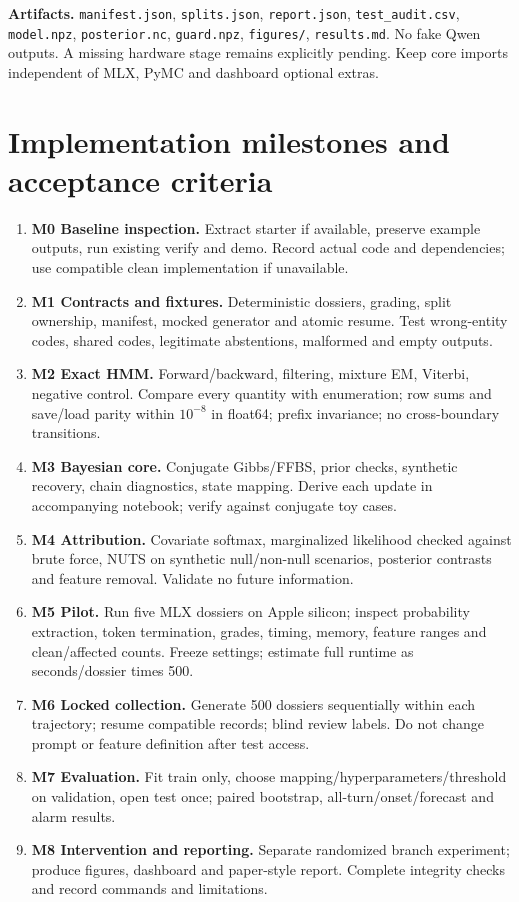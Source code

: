\documentclass[11pt,letterpaper]{article}
\newcommand{\sectionpage}[1]{\clearpage\section{#1}}
\begin{document}
\textbf{Artifacts.} \texttt{manifest.json}, \texttt{splits.json}, \texttt{report.json}, \texttt{test\_audit.csv}, \texttt{model.npz}, \texttt{posterior.nc}, \texttt{guard.npz}, \texttt{figures/}, \texttt{results.md}. No fake Qwen outputs. A missing hardware stage remains explicitly pending. Keep core imports independent of MLX, PyMC and dashboard optional extras.

\sectionpage{Implementation milestones and acceptance criteria}
\begin{enumerate}
\item \textbf{M0 Baseline inspection.} Extract starter if available, preserve example outputs, run existing verify and demo. Record actual code and dependencies; use compatible clean implementation if unavailable.
\item \textbf{M1 Contracts and fixtures.} Deterministic dossiers, grading, split ownership, manifest, mocked generator and atomic resume. Test wrong-entity codes, shared codes, legitimate abstentions, malformed and empty outputs.
\item \textbf{M2 Exact HMM.} Forward/backward, filtering, mixture EM, Viterbi, negative control. Compare every quantity with enumeration; row sums and save/load parity within $10^{-8}$ in float64; prefix invariance; no cross-boundary transitions.
\item \textbf{M3 Bayesian core.} Conjugate Gibbs/FFBS, prior checks, synthetic recovery, chain diagnostics, state mapping. Derive each update in accompanying notebook; verify against conjugate toy cases.
\item \textbf{M4 Attribution.} Covariate softmax, marginalized likelihood checked against brute force, NUTS on synthetic null/non-null scenarios, posterior contrasts and feature removal. Validate no future information.
\item \textbf{M5 Pilot.} Run five MLX dossiers on Apple silicon; inspect probability extraction, token termination, grades, timing, memory, feature ranges and clean/affected counts. Freeze settings; estimate full runtime as seconds/dossier times 500.
\item \textbf{M6 Locked collection.} Generate 500 dossiers sequentially within each trajectory; resume compatible records; blind review labels. Do not change prompt or feature definition after test access.
\item \textbf{M7 Evaluation.} Fit train only, choose mapping/hyperparameters/threshold on validation, open test once; paired bootstrap, all-turn/onset/forecast and alarm results.
\item \textbf{M8 Intervention and reporting.} Separate randomized branch experiment; produce figures, dashboard and paper-style report. Complete integrity checks and record commands and limitations.
\end{enumerate}
\end{document}
